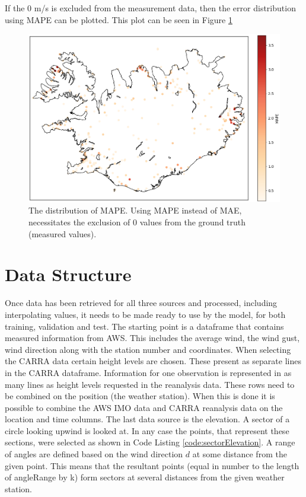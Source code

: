 If the 0 m/s is excluded from the measurement data, then the error distribution using MAPE can be plotted. This plot can be seen in Figure \ref{fig:station_mape_distribution}

\begin{figure}
    \includegraphics[scale=0.6]{Figures/MAPEoverIceland.png}
    \caption[Distribution of MAPE by station]{The distribution of MAPE. Using MAPE instead of MAE, necessitates the exclusion of 0 values from the ground truth (measured values).}
    \label{fig:station_mape_distribution}
\end{figure}

\section{Data Structure}

Once data has been retrieved for all three sources and processed, including interpolating values, it needs to be made ready to use by the model, for both training, validation and test. The starting point is a dataframe that contains measured information from AWS. This includes the average wind, the wind gust, wind direction along with the station number and coordinates. When selecting the CARRA data certain height levels are chosen. These present as separate lines in the CARRA dataframe. Information for one observation is represented in as many lines as height levels requested in the reanalysis data. These rows need to be combined on the position (the weather station). When this is done it is possible to combine the AWS IMO data and CARRA reanalysis data on the location and time columns. The last data source is the elevation. A sector of a circle looking upwind is looked at. In any case the points, that represent these sections, were selected as shown in Code Listing \ref{code:sectorElevation}. A range of angles are defined based on the wind direction $d$ at some distance from the given point. This means that the resultant points (equal in number to the length of angleRange by k) form sectors at several distances from the given weather station.

